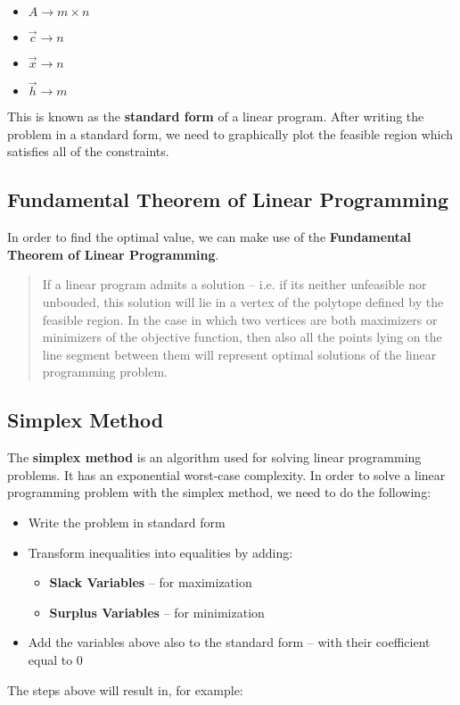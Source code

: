 \documentclass{article}
\begin{document}
\begin{itemize}
	\item $A \rightarrow m \times n$
	\item $\overrightarrow{c} \rightarrow n$
	\item $\overrightarrow{x} \rightarrow n$
	\item $\overrightarrow{h} \rightarrow m$
\end{itemize}
This is known as the \textbf{standard form} of a linear program. After writing the problem in a standard form, we need to graphically plot the feasible region which satisfies all of the constraints.

\subsection{Fundamental Theorem of Linear Programming}
In order to find the optimal value, we can make use of the \textbf{Fundamental Theorem of Linear Programming}.

\blockquote{
If a linear program admits a solution -- i.e. if its neither unfeasible nor unbouded, this solution will lie in a vertex of the polytope defined by the feasible region. In the case in which two vertices are both maximizers or minimizers of the objective function, then also all the points lying on the line segment between them will represent optimal solutions of the linear programming problem.}

\subsection{Simplex Method}
The \textbf{simplex method} is an algorithm used for solving linear programming problems. It has an exponential worst-case complexity. In order to solve a linear programming problem with the simplex method, we need to do the following:

\begin{itemize}
	\item Write the problem in standard form
	\item Transform inequalities into equalities by adding:
	\begin{itemize}
		\item \textbf{Slack Variables} -- for maximization
		\item \textbf{Surplus Variables} -- for minimization
	\end{itemize}
	\item Add the variables above also to the standard form -- with their coefficient equal to 0
\end{itemize}
The steps above will result in, for example:
\end{document}
